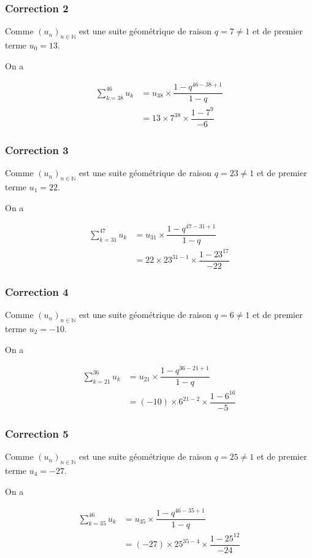 \documentclass[15pt, mathserif]{beamer}
\begin{document}
\begin{frame}
\vspace{-10mm}
	\frametitle{Correction 2}
Comme $(u_n)_{n\in\mathbb{N}}$ est une suite géométrique de raison $q = 7 \neq 1$ et de premier terme $u_0=13$.

 On a

\begin{align*}\displaystyle\sum_{k=38}^{46} u_k &= u_{38}\times \dfrac{1-q^{46-38+1}}{1-q} \\
	&=13\times 7^{38}\times \dfrac{1-7^{9}}{-6}
\end{align*}\end{frame}


\begin{frame}
\vspace{-10mm}
	\frametitle{Correction 3}
Comme $(u_n)_{n\in\mathbb{N}}$ est une suite géométrique de raison $q = 23 \neq 1$ et de premier terme $u_1=22$.

 On a

\begin{align*}\displaystyle\sum_{k=31}^{47} u_k &= u_{31}\times \dfrac{1-q^{47-31+1}}{1-q} \\
	&=22\times 23^{31-1}\times \dfrac{1-23^{17}}{-22}
\end{align*}\end{frame}


\begin{frame}
\vspace{-10mm}
	\frametitle{Correction 4}
Comme $(u_n)_{n\in\mathbb{N}}$ est une suite géométrique de raison $q = 6 \neq 1$ et de premier terme $u_2=-10$.

 On a

\begin{align*}\displaystyle\sum_{k=21}^{36} u_k &= u_{21}\times \dfrac{1-q^{36-21+1}}{1-q} \\
	&=\left(-10\right)\times 6^{21-2}\times \dfrac{1-6^{16}}{-5}
\end{align*}\end{frame}


\begin{frame}
\vspace{-10mm}
	\frametitle{Correction 5}
Comme $(u_n)_{n\in\mathbb{N}}$ est une suite géométrique de raison $q = 25 \neq 1$ et de premier terme $u_4=-27$.

 On a

\begin{align*}\displaystyle\sum_{k=35}^{46} u_k &= u_{35}\times \dfrac{1-q^{46-35+1}}{1-q} \\
	&=\left(-27\right)\times 25^{35-4}\times \dfrac{1-25^{12}}{-24}
\end{align*}\end{frame}
\end{document}
